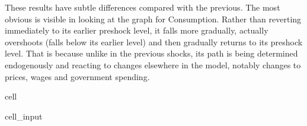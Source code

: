 \documentclass[letterpaper,10pt,english]{jupyterBook}
\begin{document}
\sphinxAtStartPar
These results have subtle differences compared with the previous.  The most obvious is visible in looking at the graph for Consumption.  Rather than reverting immediately to its earlier pre\sphinxhyphen{}shock level, it falls more gradually, actually overshoots (falls below its earlier level) and then gradually returns to its pre\sphinxhyphen{}shock level.  That is because unlike in the previous shocks, its path is being determined endogenously and reacting to changes elsewhere in the model, notably changes to prices, wages and government spending.

\begin{sphinxuseclass}{cell}\begin{sphinxVerbatimInput}

\begin{sphinxuseclass}{cell_input}
\begin{sphinxVerbatim}[commandchars=\\\{\}]


\end{sphinxVerbatim}
\end{sphinxuseclass}
\end{sphinxVerbatimInput}
\end{sphinxuseclass}
\end{document}
